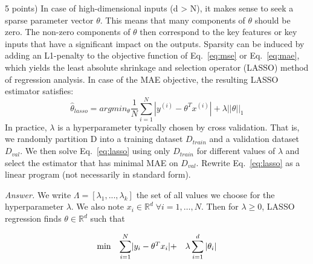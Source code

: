 \documentclass[10pt]{article}
\newenvironment{exercise}[2][Exercise]{\begin{trivlist}
  \item[\hskip \labelsep {\bfseries #1}\hskip \labelsep {\bfseries #2.}]}{\end{trivlist}}
\begin{document}
\begin{exercise}{2}
(5 points) In case of high-dimensional inputs (d > N), it makes sense to seek a sparse
parameter vector $\theta$. This means that many components of $\theta$ should be zero. The non-zero components of $\theta$ then correspond to the key features or key inputs that have a significant impact on the outputs. Sparsity can be induced by adding an L1-penalty to the objective function of Eq.~\ref{eq:mse} or Eq.~\ref{eq:mae}, which yields the least absolute
shrinkage and selection operator (LASSO) method of regression analysis. In case of the MAE objective, the resulting LASSO estimator satisfies:
\begin{equation}\label{eq:lasso}
    \hat\theta_{lasso} = arg min_\theta  \frac{1}{N} \sum_{i=1}^N|y^{(i)}-\theta^Tx^{(i)}| + \lambda ||\theta||_1 
\end{equation}
In practice, $\lambda$ is a hyperparameter typically chosen by cross validation. That is, we randomly partition D into a training dataset $D_{train}$
and a validation dataset $D_{val}$. We then solve Eq.~\ref{eq:lasso} using only $D_{train}$ for different
values of $\lambda$ and select the estimator that has minimal MAE on $D_{val}$. Rewrite Eq.~\ref{eq:lasso} as a linear program (not necessarily in standard form).

\textit{Answer.} 
We write $\Lambda = [\lambda_1, ... , \lambda_k]$ the set of all values we choose for the hyperparameter $\lambda$. We also note $x_i\in \mathbb{R}^d \; \forall i=1 ,\dots, N$. Then for $\lambda\geq 0$, LASSO regression finds $\theta \in \mathbb{R}^d$ such that   

\begin{equation}
\begin{array}{ll@{}lll}
\text{min} &\displaystyle\sum\limits_{i=1}^{N} & |y_i-\theta^Tx_i| + &\lambda\displaystyle\sum\limits_{i=1}^{d}|\theta_i|
\end{array}
\end{equation}


\end{exercise}
\end{document}
